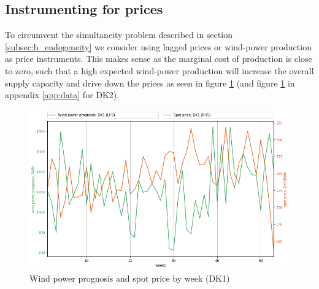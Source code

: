 \subsection{Instrumenting for prices}
\label{subsec:e_instrumenting}
To circumvent the simultaneity problem described in section \ref{subsec:b_endogeneity} we consider using lagged prices or wind-power production as price instruments. This makes sense as the marginal cost of production is close to zero, such that a high expected wind-power production will increase the overall supply capacity and drive down the prices as seen in figure \ref{fig:wp_price_dk1_week} (and figure \ref{fig:wp_price_dk1_week} in appendix \ref{app:data} for DK2).
\begin{figure}[H]
  \centering
  \caption{Wind power prognosis and spot price by week (DK1)}
  \label{fig:wp_price_dk1_week}
    \includegraphics[width=1 \textwidth]{03_figures/wp_DK1_weeks}
\end{figure}

